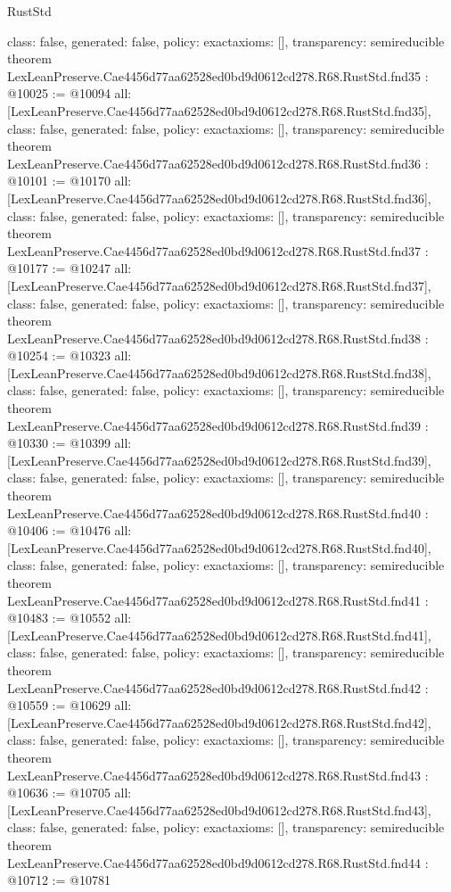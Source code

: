 \begin{lexlean}{RustStd}
\begin{coremodule}
{  class: false,
  generated: false,
  policy: exact{axioms: []},
  transparency: semireducible
}
theorem LexLeanPreserve.Cae4456d77aa62528ed0bd9d0612cd278.R68.RustStd.fnd35 : @10025 := @10094 {
  all: [LexLeanPreserve.Cae4456d77aa62528ed0bd9d0612cd278.R68.RustStd.fnd35],
  class: false,
  generated: false,
  policy: exact{axioms: []},
  transparency: semireducible
}
theorem LexLeanPreserve.Cae4456d77aa62528ed0bd9d0612cd278.R68.RustStd.fnd36 : @10101 := @10170 {
  all: [LexLeanPreserve.Cae4456d77aa62528ed0bd9d0612cd278.R68.RustStd.fnd36],
  class: false,
  generated: false,
  policy: exact{axioms: []},
  transparency: semireducible
}
theorem LexLeanPreserve.Cae4456d77aa62528ed0bd9d0612cd278.R68.RustStd.fnd37 : @10177 := @10247 {
  all: [LexLeanPreserve.Cae4456d77aa62528ed0bd9d0612cd278.R68.RustStd.fnd37],
  class: false,
  generated: false,
  policy: exact{axioms: []},
  transparency: semireducible
}
theorem LexLeanPreserve.Cae4456d77aa62528ed0bd9d0612cd278.R68.RustStd.fnd38 : @10254 := @10323 {
  all: [LexLeanPreserve.Cae4456d77aa62528ed0bd9d0612cd278.R68.RustStd.fnd38],
  class: false,
  generated: false,
  policy: exact{axioms: []},
  transparency: semireducible
}
theorem LexLeanPreserve.Cae4456d77aa62528ed0bd9d0612cd278.R68.RustStd.fnd39 : @10330 := @10399 {
  all: [LexLeanPreserve.Cae4456d77aa62528ed0bd9d0612cd278.R68.RustStd.fnd39],
  class: false,
  generated: false,
  policy: exact{axioms: []},
  transparency: semireducible
}
theorem LexLeanPreserve.Cae4456d77aa62528ed0bd9d0612cd278.R68.RustStd.fnd40 : @10406 := @10476 {
  all: [LexLeanPreserve.Cae4456d77aa62528ed0bd9d0612cd278.R68.RustStd.fnd40],
  class: false,
  generated: false,
  policy: exact{axioms: []},
  transparency: semireducible
}
theorem LexLeanPreserve.Cae4456d77aa62528ed0bd9d0612cd278.R68.RustStd.fnd41 : @10483 := @10552 {
  all: [LexLeanPreserve.Cae4456d77aa62528ed0bd9d0612cd278.R68.RustStd.fnd41],
  class: false,
  generated: false,
  policy: exact{axioms: []},
  transparency: semireducible
}
theorem LexLeanPreserve.Cae4456d77aa62528ed0bd9d0612cd278.R68.RustStd.fnd42 : @10559 := @10629 {
  all: [LexLeanPreserve.Cae4456d77aa62528ed0bd9d0612cd278.R68.RustStd.fnd42],
  class: false,
  generated: false,
  policy: exact{axioms: []},
  transparency: semireducible
}
theorem LexLeanPreserve.Cae4456d77aa62528ed0bd9d0612cd278.R68.RustStd.fnd43 : @10636 := @10705 {
  all: [LexLeanPreserve.Cae4456d77aa62528ed0bd9d0612cd278.R68.RustStd.fnd43],
  class: false,
  generated: false,
  policy: exact{axioms: []},
  transparency: semireducible
}
theorem LexLeanPreserve.Cae4456d77aa62528ed0bd9d0612cd278.R68.RustStd.fnd44 : @10712 := @10781 {
}
\end{coremodule}
\end{lexlean}
